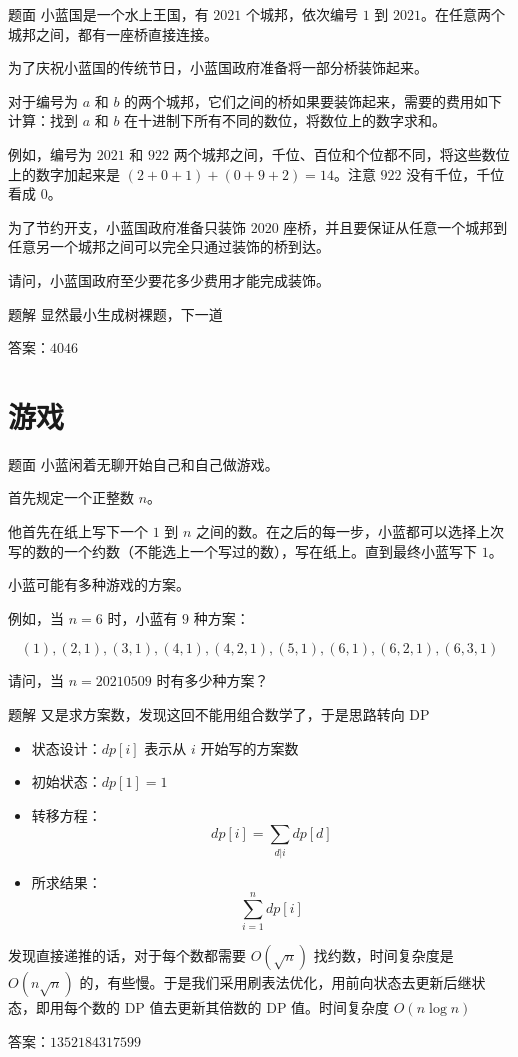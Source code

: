 \documentclass{pptt}
\begin{document}
\begin{frame}{题面}
    小蓝国是一个水上王国，有 $2021$ 个城邦，依次编号 $1$ 到 $2021$。在任意两个城邦之间，都有一座桥直接连接。

    为了庆祝小蓝国的传统节日，小蓝国政府准备将一部分桥装饰起来。

    对于编号为 $a$ 和 $b$ 的两个城邦，它们之间的桥如果要装饰起来，需要的费用如下计算：找到 $a$ 和 $b$ 在十进制下所有不同的数位，将数位上的数字求和。

    例如，编号为 $2021$ 和 $922$ 两个城邦之间，千位、百位和个位都不同，将这些数位上的数字加起来是 $(2+0+1)+(0+9+2)=14$。注意 $922$ 没有千位，千位看成 $0$。

    为了节约开支，小蓝国政府准备只装饰 $2020$ 座桥，并且要保证从任意一个城邦到任意另一个城邦之间可以完全只通过装饰的桥到达。

    请问，小蓝国政府至少要花多少费用才能完成装饰。
\end{frame}

\begin{frame}{题解}
    显然最小生成树裸题，下一道

    答案：$4046$
\end{frame}

\section{游戏}

\begin{frame}{题面}
    小蓝闲着无聊开始自己和自己做游戏。

    首先规定一个正整数 $n$。

    他首先在纸上写下一个 $1$ 到 $n$ 之间的数。在之后的每一步，小蓝都可以选择上次写的数的一个约数（不能选上一个写过的数），写在纸上。直到最终小蓝写下 $1$。

    小蓝可能有多种游戏的方案。

    例如，当 $n=6$ 时，小蓝有 $9$ 种方案：
    
    $$(1), (2,1), (3,1), (4,1), (4,2,1), (5,1), (6,1), (6,2,1), (6,3,1)$$

    请问，当 $n=20210509$ 时有多少种方案？
\end{frame}

\begin{frame}{题解}
    又是求方案数，发现这回不能用组合数学了，于是思路转向 DP

    \begin{itemize}
        \item 状态设计：$dp[i]$ 表示从 $i$ 开始写的方案数
        \item 初始状态：$dp[1] = 1$
        \item 转移方程：$$dp[i] = \sum_{d|i} dp[d]$$
        \item 所求结果：$$\sum_{i=1}^{n} dp[i]$$
    \end{itemize}

    发现直接递推的话，对于每个数都需要 $O(\sqrt n)$ 找约数，时间复杂度是 $O(n \sqrt n)$ 的，有些慢。于是我们采用刷表法优化，用前向状态去更新后继状态，即用每个数的 DP 值去更新其倍数的 DP 值。时间复杂度 $O(n \log n)$

    答案：$1352184317599$
\end{frame}
\end{document}
